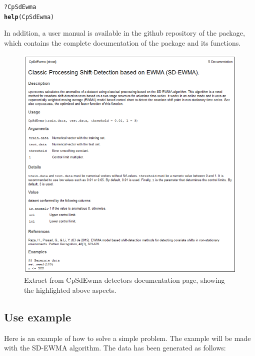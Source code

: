 \documentclass[a4paper]{article}\usepackage[]{graphicx}\usepackage[]{color}
\makeatletter
\newcommand{\hlopt}[1]{\textcolor[rgb]{0,0,0}{#1}}%
\newcommand{\hlstd}[1]{\textcolor[rgb]{0.345,0.345,0.345}{#1}}%
\newcommand{\hlkwd}[1]{\textcolor[rgb]{0.737,0.353,0.396}{\textbf{#1}}}%
\newenvironment{kframe}{%
 \def\at@end@of@kframe{}%
 \ifinner\ifhmode%
  \def\at@end@of@kframe{\end{minipage}}%
  \begin{minipage}{\columnwidth}%
 \fi\fi%
 \def\FrameCommand##1{\hskip\@totalleftmargin \hskip-\fboxsep
 \colorbox{shadecolor}{##1}\hskip-\fboxsep
     \hskip-\linewidth \hskip-\@totalleftmargin \hskip\columnwidth}%
 \MakeFramed {\advance\hsize-\width
   \@totalleftmargin\z@ \linewidth\hsize
   \@setminipage}}%
 {\par\unskip\endMakeFramed%
 \at@end@of@kframe}
\newenvironment{knitrout}{}{} %
\makeatother
\begin{document}
\begin{knitrout}
\color{fgcolor}\begin{kframe}
\begin{alltt}
\hlopt{?}\hlstd{CpSdEwma}
\hlkwd{help}\hlstd{(CpSdEwma)}
\end{alltt}
\end{kframe}
\end{knitrout}

In addition, a user manual is available in the github repository of the   package, which contains the complete documentation of the package and its functions.

\begin{figure}[htbp]
\centering
\includegraphics[width=0.5\linewidth]{documentationExample.png}
\caption{Extract from CpSdEwma detectors documentation page, showing the highlighted above aspects.}
\label{fig:documentation}
\end{figure}

\newpage

\subsection{Use example}\label{sec:example}

Here is an example of how to solve a simple problem. The example will be made with the SD-EWMA algorithm. The data has been generated as follows:
\end{document}

